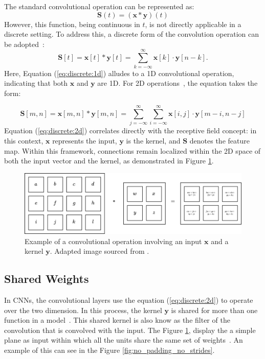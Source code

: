 The standard convolutional operation can be represented as:
\begin{equation*}
\boldsymbol{S}(t) = (\boldsymbol{x} * \boldsymbol{y})(t)
\end{equation*}
However, this function, being continuous in \(t\), is not directly applicable in a discrete setting. To address this, a discrete form of the convolution operation can be adopted~\cite{Arndt2011}:
\begin{equation}
\boldsymbol{S}[t]=\boldsymbol{x}[t] * \boldsymbol{y}[t]=\sum_{k=-\infty}^{\infty} \boldsymbol{x}[k] \cdot \boldsymbol{y}[n-k]. \label{eq:discrete:1d}
\end{equation}
Here, Equation (\ref{eq:discrete:1d}) alludes to a 1D convolutional operation, indicating that both \(\boldsymbol{x}\) and \(\boldsymbol{y}\) are 1D. For 2D operations~\cite{Arndt2011}, the equation takes the form:

\begin{equation}
\boldsymbol{S}[m, n]=\boldsymbol{x}[m, n] * \boldsymbol{y}[m, n]=\sum_{j=-\infty}^{\infty} \sum_{i=-\infty}^{\infty} \boldsymbol{x}[i, j] \cdot \boldsymbol{y}[m-i, n-j] \label{eq:discrete:2d}
\end{equation}
Equation (\ref{eq:discrete:2d}) correlates directly with the receptive field concept: in this context, \(\boldsymbol{x}\) represents the input, \(\boldsymbol{y}\) is the kernel, and \(\boldsymbol{S}\) denotes the feature map. Within this framework, connections remain localized within the 2D space of both the input vector and the kernel, as demonstrated in Figure \ref{fig:conv-op}.
\begin{figure}[htb]
    \centering
    \includegraphics[width=0.9\linewidth]{figures/chapters-imgs/20/conv-op.jpg}
    \caption[Example of a convolutional operation involving an input \(\boldsymbol{x}\) and a kernel \(\boldsymbol{y}\).]{Example of a convolutional operation involving an input \(\boldsymbol{x}\) and a kernel \(\boldsymbol{y}\). Adapted image sourced from \cite{Goodfellow-et-al-2016}.}
    \label{fig:conv-op}
\end{figure}

\subsection{Shared Weights}
In CNNs, the convolutional layers use the equation (\ref{eq:discrete:2d}) to operate over the two dimension. In this process, the kernel $\boldsymbol{y}$ is shared for more than one function in a model~\cite{Goodfellow-et-al-2016}. This shared kernel is also know as the filter of the convolution that is convolved with the input. The Figure \ref{fig:conv-op}, display the a simple plane as input within which all the units share the same set of weights~\cite{726791}. An example of this can see in the Figure \ref{fig:no_padding_no_strides}.

